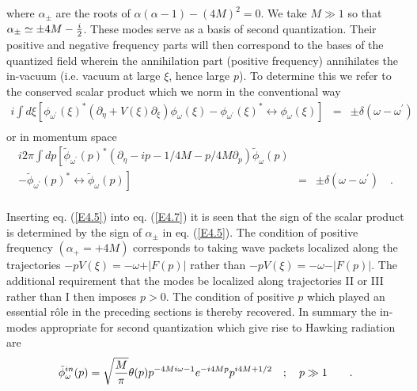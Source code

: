 \documentclass[12pt]{article}
\begin{document}
\noindent where $\alpha _{\pm}$ are the roots of $ \alpha (\alpha - 1) - (4 M)^2 = 0$. We
take $ M \gg 1$ so that $ \alpha_\pm \simeq \pm 4 M - {i \over 2}$. These modes serve as
a basis of second quantization. Their positive and negative frequency parts will then
correspond to the bases of the quantized field wherein the annihilation part (positive
frequency) annihilates the in-vacuum (i.e. vacuum at large $ \xi$, hence large
$p$). To determine this we refer to the conserved scalar product which we norm
in the conventional way
\begin{eqnarray}
i\int\! d \xi\left[ \phi_{\omega^\prime}(\xi) ^* 
\left( \partial_\eta + V(\xi) \partial_\xi\right)
\phi_\omega (\xi)-\phi_{\omega^\prime}(\xi) ^*\leftrightarrow \phi_\omega (\xi)\right]
&=& \pm \delta (\omega - \omega^\prime) \nonumber\\
\label {E4.7a}
\end{eqnarray}
or in momentum space
\begin{eqnarray}
i 2\pi\int\! d p \left[ \tilde \phi_{\omega^\prime}(p) ^* 
\left( 
\partial_\eta - i p - {1/ 4M} - {p / 4 M} \partial_p 
\right)
\tilde \phi_\omega (p) \right.\!&&\nonumber \\
\left.-\tilde \phi_{\omega^\prime}(p) ^* \leftrightarrow 
\tilde \phi_\omega (p) \right]&=& \pm
\delta (\omega - \omega^\prime) \quad .\nonumber \\\label {E4.7}
\end{eqnarray}



\noindent Inserting  eq. (\ref{E4.5}) into  eq. (\ref {E4.7}) it is seen that the
sign of the scalar product is determined by the sign of $ \alpha_\pm $ in
 eq. (\ref {E4.5}).
The condition of positive frequency $(\alpha_+= +4M)$  corresponds to taking
wave packets localized along the trajectories $-p V(\xi) = - \omega + \vert
F(p) \vert$ rather than $-p V(\xi) = - \omega - \vert
F(p) \vert$. The additional requirement that the modes be localized along
trajectories II or III rather than I then imposes $p>0$. The condition of
positive $p$ which played an essential r{\^o}le in the preceding sections is
thereby recovered. In summary the in-modes appropriate for second quantization
which give rise to Hawking radiation are 
\begin{eqnarray} \tilde
\phi_\omega^{in} (p) = \sqrt{ M \over \pi}  \theta (p)  p^{- 4
M i \omega - 1} e^{-i 4 M p} p^{i 4M+1/2} \quad ; \quad  p \gg 1 \qquad .
\label{E4.8a} \end{eqnarray}
\end{document}
